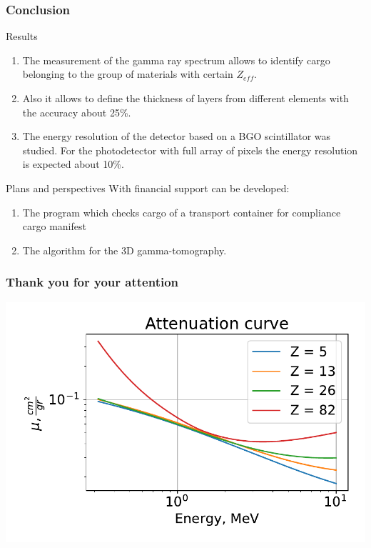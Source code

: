 \documentclass[11pt]{beamer}
\begin{document}
\begin{frame}
    \frametitle{Conclusion}
    
    \begin{block}{Results}%
    \begin{enumerate}
        \item The measurement of the gamma ray spectrum allows to identify cargo belonging to the group of materials with certain $Z_{eff}$.
        \item Also it allows to define the thickness of layers from different elements with the accuracy about 25\%.
        \item The energy resolution of the detector based on a BGO scintillator was studied.  For the photodetector with full array of pixels the energy resolution is expected about 10\%.
    \end{enumerate}
    \end{block}
\begin{block}{Plans and perspectives}%
    With financial support can be developed:
    \begin{enumerate}
        \item The program which checks cargo of a transport container  for compliance cargo manifest
        \item The algorithm for the 3D gamma-tomography.
    \end{enumerate}
\end{block}

\end{frame}

\begin{frame}
    \frametitle{Thank you for your attention}
            \includegraphics[width=1\textwidth]{figures/Attenuation.pdf}
\end{frame}
\end{document}
